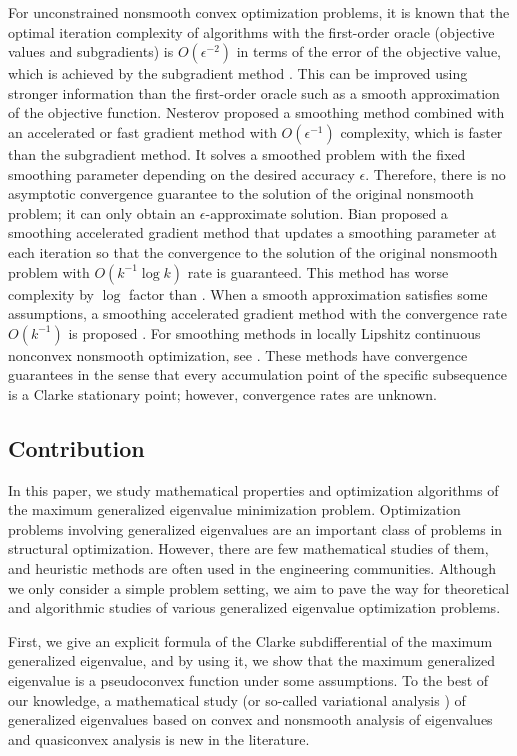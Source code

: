 \documentclass[sn-mathphys,Numbered]{sn-jnl}%
\theoremstyle{thmstyleone}%
\theoremstyle{thmstyletwo}%
\theoremstyle{thmstylethree}%
\begin{document}
For unconstrained nonsmooth convex optimization problems, it is known that the optimal iteration complexity of algorithms with the first-order oracle (objective values and subgradients) is $O(\epsilon^{-2})$ in terms of the error of the objective value, which is achieved by the subgradient method \cite{nesterov18}. This can be improved using stronger information than the first-order oracle such as a smooth approximation of the objective function. Nesterov \cite{nesterov05} proposed a smoothing method combined with an accelerated or fast gradient method with $O(\epsilon^{-1})$ complexity, which is faster than the subgradient method. It solves a smoothed problem with the fixed smoothing parameter depending on the desired accuracy $\epsilon$. Therefore, there is no asymptotic convergence guarantee to the solution of the original nonsmooth problem; it can only obtain an $\epsilon$-approximate solution. Bian \cite{bian21,bian20c} proposed a smoothing accelerated gradient method that updates a smoothing parameter at each iteration so that the convergence to the solution of the original nonsmooth problem with $O(k^{-1}\log k)$ rate is guaranteed. This method has worse complexity by $\log$ factor than \cite{nesterov05}. When a smooth approximation satisfies some assumptions, a smoothing accelerated gradient method with the convergence rate $O(k^{-1})$ is proposed \cite{tran17}. For smoothing methods in locally Lipshitz continuous nonconvex nonsmooth optimization, see \cite{chen12,zhang09,nishioka23smao}. These methods have convergence guarantees in the sense that every accumulation point of the specific subsequence is a Clarke stationary point; however, convergence rates are unknown.

\subsection{Contribution}

In this paper, we study mathematical properties and optimization algorithms of the maximum generalized eigenvalue minimization problem. Optimization problems involving generalized eigenvalues are an important class of problems in structural optimization. However, there are few mathematical studies of them, and heuristic methods are often used in the engineering communities. Although we only consider a simple problem setting, we aim to pave the way for theoretical and algorithmic studies of various generalized eigenvalue optimization problems.

First, we give an explicit formula of the Clarke subdifferential of the maximum generalized eigenvalue, and by using it, we show that the maximum generalized eigenvalue is a pseudoconvex function under some assumptions. To the best of our knowledge, a mathematical study (or so-called variational analysis \cite{rockafellar98}) of generalized eigenvalues based on convex and nonsmooth analysis of eigenvalues \cite{lewis96,overton92} and quasiconvex analysis \cite{greenberg73,kiwiel01} is new in the literature. 
\end{document}
